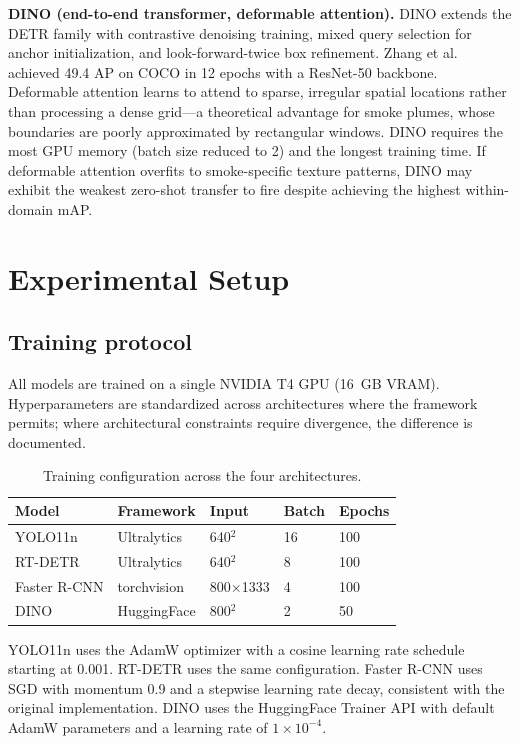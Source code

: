 \documentclass[10pt,twocolumn]{article}
\begin{document}
\textbf{DINO (end-to-end transformer, deformable attention).} DINO extends the DETR family with contrastive denoising training, mixed query selection for anchor initialization, and look-forward-twice box refinement. Zhang et al.~\cite{zhang2022dino} achieved 49.4 AP on COCO in 12 epochs with a ResNet-50 backbone. Deformable attention learns to attend to sparse, irregular spatial locations rather than processing a dense grid---a theoretical advantage for smoke plumes, whose boundaries are poorly approximated by rectangular windows. DINO requires the most GPU memory (batch size reduced to 2) and the longest training time. If deformable attention overfits to smoke-specific texture patterns, DINO may exhibit the weakest zero-shot transfer to fire despite achieving the highest within-domain mAP.

\section{Experimental Setup}

\subsection{Training protocol}

All models are trained on a single NVIDIA T4 GPU (16~GB VRAM). Hyperparameters are standardized across architectures where the framework permits; where architectural constraints require divergence, the difference is documented.

\begin{table}[H]
\centering
\caption{Training configuration across the four architectures.}
\label{tab:training}
\begin{tabular}{@{}p{}p{}p{}p{}p{}@{}}
\toprule
\textbf{Model} & \textbf{Framework} & \textbf{Input} & \textbf{Batch} & \textbf{Epochs} \\
\midrule
YOLO11n & Ultralytics & 640\(^2\) & 16 & 100 \\
RT-DETR & Ultralytics & 640\(^2\) & 8  & 100 \\
Faster R-CNN & torchvision & 800\(\times\)1333 & 4 & 100 \\
DINO & HuggingFace & 800\(^2\) & 2 & 50 \\
\bottomrule
\end{tabular}
\end{table}

YOLO11n uses the AdamW optimizer with a cosine learning rate schedule starting at 0.001. RT-DETR uses the same configuration. Faster R-CNN uses SGD with momentum 0.9 and a stepwise learning rate decay, consistent with the original implementation. DINO uses the HuggingFace Trainer API with default AdamW parameters and a learning rate of \(1 \times 10^{-4}\).
\end{document}
